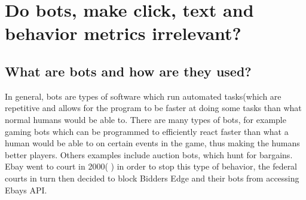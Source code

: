 \chapter[Bot Metrics]{Do bots,  make click, text and behavior metrics irrelevant?}

\section{What are bots and how are they used?}
In general, bots are types of software which run automated tasks(which are repetitive and allows for the program to be faster at doing some tasks than what normal humans would be able to. There are many types of bots, for example gaming bots which can be programmed to efficiently react faster than what a human would be able to on certain events in the game, thus making the humans better players. Others examples include auction bots, which hunt for bargains. Ebay went to court in 2000( \cite{Computerworld:Ebay}) in order to stop this type of behavior, the federal courts in turn then decided to block Bidders Edge and their bots from accessing Ebays API.
\\

